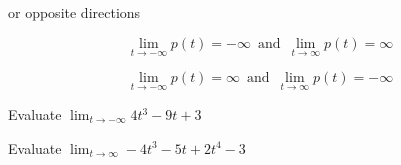 \documentclass{ximera}
\begin{document}
or opposite directions

\[    \lim_{t \to -\infty} p(t) =  -\infty  \,   \text{ and }  \,     \lim_{t \to \infty} p(t) = \infty      \]

\[    \lim_{t \to -\infty} p(t) =  \infty  \,   \text{ and }  \,     \lim_{t \to \infty} p(t) = -\infty      \]











\begin{question}

Evaluate $\lim_{t \to -\infty} 4 t^3 - 9 t + 3$


\begin{multipleChoice}
\choice [correct]{$-\infty$}
\choice {$\infty$}
\end{multipleChoice}

\end{question}







\begin{question}

Evaluate $\lim_{t \to \infty} -4 t^3 - 5 t + 2 t^4  - 3$


\begin{multipleChoice}
\choice {$-\infty$}
\choice [correct]{$\infty$}
\end{multipleChoice}

\end{question}
\end{document}
